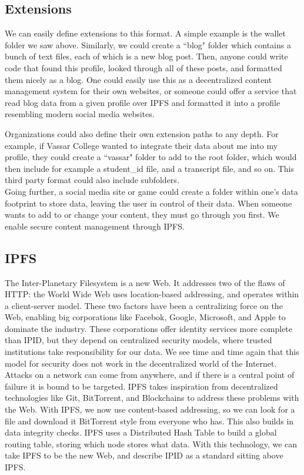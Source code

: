 \documentclass{article}
\begin{document}
\subsection{Extensions}

We can easily define extensions to this format. A simple example is the wallet folder we saw above. Similarly, we could create a ``blog" folder which contains a bunch of text files, each of which is a new blog post. Then, anyone could write code that found this profile, looked through all of these posts, and formatted them nicely as a blog. One could easily use this as a decentralized content management system for their own websites, or someone could offer a service that read blog data from a given profile over IPFS and formatted it into a profile resembling modern social media websites. \par
Organizations could also define their own extension paths to any depth. For example, if Vassar College wanted to integrate their data about me into my profile, they could create a ``vassar" folder to add to the root folder, which would then include for example a student\_id file, and a transcript file, and so on. This third party format could also include subfolders. \\
Going further, a social media site or game could create a folder within one's data footprint to store data, leaving the user in control of their data. When someone wants to add to or change your content, they must go through you first. We enable secure content management through IPFS.

\subsection{IPFS}

The Inter-Planetary Filesystem is a new Web. It addresses two of the flaws of HTTP: the World Wide Web uses location-based addressing, and operates within a client-server model. These two factors have been a centralizing force on the Web, enabling big corporations like Facebok, Google, Microsoft, and Apple to dominate the industry. These corporations offer identity services more complete than IPID, but they depend on centralized security models, where trusted institutions take responsibility for our data. We see time and time again that this model for security does not work in the decentralized world of the Internet. Attacks on a network can come from anywhere, and if there is a central point of failure it is bound to be targeted. IPFS takes inspiration from decentralized technologies like Git, BitTorrent, and Blockchains to address these problems with the Web. With IPFS, we now use content-based addressing, so we can look for a file and download it BitTorrent style from everyone who has. This also builds in data integrity checks. IPFS uses a Distributed Hash Table to build a global routing table, storing which node stores what data. With this technology, we can take IPFS to be the new Web, and describe IPID as a standard sitting above IPFS.
\end{document}
